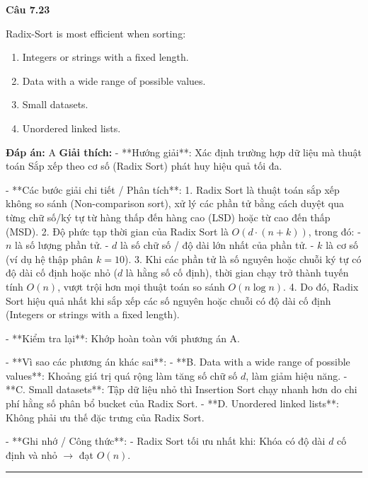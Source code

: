 \documentclass[11pt,a4paper]{article}
\newenvironment{question}[1]{%
  \par\vspace{1em}\noindent\textbf{\large Câu #1}\par\vspace{0.4em}
}{%
  \par\vspace{1em}\hrule\vspace{0.6em}
}
\newenvironment{choices}{%
  \begin{enumerate}[label=\textbf{\Alph*.},leftmargin=2.2em,itemsep=2pt,topsep=3pt]
}{%
  \end{enumerate}
}
\newcommand{\choice}{\item}
\begin{document}
\begin{question}{7.23}
Radix-Sort is most efficient when sorting:
\begin{choices}
\choice Integers or strings with a fixed length.
\choice Data with a wide range of possible values.
\choice Small datasets.
\choice Unordered linked lists.
\end{choices}
\textbf{Đáp án:} A
\textbf{Giải thích:} - **Hướng giải**:
  Xác định trường hợp dữ liệu mà thuật toán Sắp xếp theo cơ số (Radix Sort) phát huy hiệu quả tối đa.

- **Các bước giải chi tiết / Phân tích**:
  1. Radix Sort là thuật toán sắp xếp không so sánh (Non-comparison sort), xử lý các phần tử bằng cách duyệt qua từng chữ số/ký tự từ hàng thấp đến hàng cao (LSD) hoặc từ cao đến thấp (MSD).
  2. Độ phức tạp thời gian của Radix Sort là \(O(d \cdot (n + k))\), trong đó:
     - \(n\) là số lượng phần tử.
     - \(d\) là số chữ số / độ dài lớn nhất của phần tử.
     - \(k\) là cơ số (ví dụ hệ thập phân \(k = 10\)).
  3. Khi các phần tử là số nguyên hoặc chuỗi ký tự có độ dài cố định hoặc nhỏ (\(d\) là hằng số cố định), thời gian chạy trở thành tuyến tính \(O(n)\), vượt trội hơn mọi thuật toán so sánh \(O(n \log n)\).
  4. Do đó, Radix Sort hiệu quả nhất khi sắp xếp các số nguyên hoặc chuỗi có độ dài cố định (Integers or strings with a fixed length).

- **Kiểm tra lại**:
  Khớp hoàn toàn với phương án A.

- **Vì sao các phương án khác sai**:
  - **B. Data with a wide range of possible values**: Khoảng giá trị quá rộng làm tăng số chữ số \(d\), làm giảm hiệu năng.
  - **C. Small datasets**: Tập dữ liệu nhỏ thì Insertion Sort chạy nhanh hơn do chi phí hằng số phân bổ bucket của Radix Sort.
  - **D. Unordered linked lists**: Không phải ưu thế đặc trưng của Radix Sort.

- **Ghi nhớ / Công thức**:
  - Radix Sort tối ưu nhất khi: Khóa có độ dài \(d\) cố định và nhỏ \(\rightarrow\) đạt \(O(n)\).
\end{question}
\end{document}
